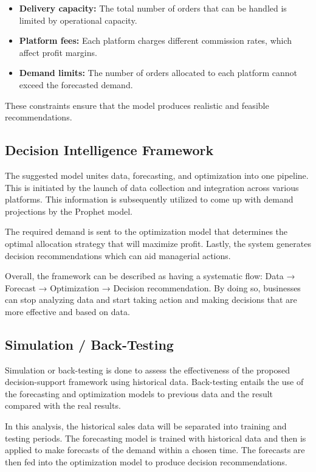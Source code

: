\begin{itemize}
    \item \textbf{Delivery capacity:} The total number of orders that can be handled is limited by operational capacity.
    
    \item \textbf{Platform fees:} Each platform charges different commission rates, which affect profit margins.
    
    \item \textbf{Demand limits:} The number of orders allocated to each platform cannot exceed the forecasted demand.
\end{itemize}

These constraints ensure that the model produces realistic and feasible recommendations.


\subsection{Decision Intelligence Framework}

The suggested model unites data, forecasting, and optimization into one pipeline. This is initiated by the launch of data collection and integration across various platforms. This information is subsequently utilized to come up with demand projections by the Prophet model. 

The required demand is sent to the optimization model that determines the optimal allocation strategy that will maximize profit. Lastly, the system generates decision recommendations which can aid managerial actions. 

Overall, the framework can be described as having a systematic flow: Data → Forecast → Optimization → Decision recommendation. By doing so, businesses can stop analyzing data and start taking action and making decisions that are more effective and based on data.


\subsection{Simulation / Back-Testing}

Simulation or back-testing is done to assess the effectiveness of the proposed decision-support framework using historical data. Back-testing entails the use of the forecasting and optimization models to previous data and the result compared with the real results. 

In this analysis, the historical sales data will be separated into training and testing periods. The forecasting model is trained with historical data and then is applied to make forecasts of the demand within a chosen time. The forecasts are then fed into the optimization model to produce decision recommendations. 

